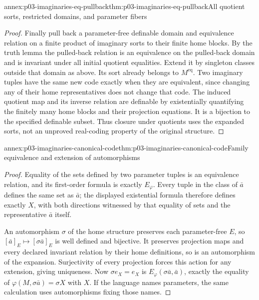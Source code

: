 \begin{annexitem}{annex:p03-imaginaries-eq-pullback}{thm:p03-imaginaries-eq-pullback}{All quotient sorts, restricted domains, and parameter fibers}
\begin{proof}
Finally pull back a parameter-free definable domain and equivalence relation
on a finite product of imaginary sorts to their finite home blocks. By the
truth lemma the pulled-back relation is an equivalence on the pulled-back
domain and is invariant under all initial quotient equalities. Extend it by
singleton classes outside that domain as above. Its sort already belongs
to \(M^{\mathrm{eq}}\). Two imaginary tuples have the same new code
exactly when they are equivalent, since changing any of their home
representatives does not change that code. The induced quotient map and its
inverse relation are definable by existentially quantifying the finitely many
home blocks and their projection equations. It is a bijection to the
specified definable subset. Thus closure under quotients uses the expanded
sorts, not an unproved real-coding property of the original structure.
\end{proof}
\end{annexitem}

\begin{annexitem}{annex:p03-imaginaries-canonical-code}{thm:p03-imaginaries-canonical-code}{Family equivalence and extension of automorphisms}
\begin{proof}
Equality of the sets defined by two parameter tuples is an equivalence
relation, and its first-order formula is exactly \(E_\varphi\).
Every tuple in the class of \(\bar a\) defines the same set as
\(\bar a\); the displayed existential formula therefore defines exactly
\(X\), with both directions witnessed by that equality of sets and the
representative \(\bar a\) itself.

An automorphism \(\sigma\) of the home structure preserves each
parameter-free \(E\), so \([\bar a]_E\mapsto[\sigma\bar a]_E\)
is well defined and bijective. It preserves projection maps and every
declared invariant relation by their home definitions, so is an automorphism
of the expansion. Surjectivity of every projection forces this action for
any extension, giving uniqueness. Now \(\sigma e_X=e_X\) is
\(E_\varphi(\sigma\bar a,\bar a)\), exactly the equality of
\(\varphi(M,\sigma\bar a)=\sigma X\) with \(X\). If the language
names parameters, the same calculation uses automorphisms fixing those names.
\end{proof}
\end{annexitem}

